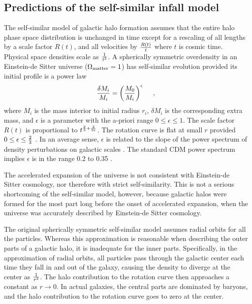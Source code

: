 \documentclass[aps,prd,preprint,tightenlines,floatfix,showpacs,groupedaddress]{revtex4}
\begin{document}
\subsection{Predictions of the self-similar infall model}

The self-similar model of galactic halo formation \cite{FG,B,STW}
assumes that the entire halo phase space distribution is unchanged 
in time except for a rescaling of all lengths by a scale factor 
$R(t)$, and all velocities by ${R(t) \over t}$ where $t$ is cosmic 
time.  Physical space densities scale as ${1 \over t^2}$.  A 
spherically symmetric overdensity in an Einstein-de Sitter universe 
($\Omega_{\rm matter} = 1$) has self-similar evolution provided its 
initial profile is a power law \cite{FG,B}
\begin{equation}
{\delta M_i \over M_i} = \left({M_0 \over M_i}\right)^\epsilon~~~\ ,
\label{prof}
\end{equation}
where $M_i$ is the mass interior to initial radius $r_i$, $\delta M_i$ 
is the corresponding extra mass, and $\epsilon$ is a parameter with the 
a-priori range $0 \leq \epsilon \leq 1$.  The scale factor $R(t)$ is 
proportional to $t^{{2 \over 3} + {2 \over 9 \epsilon}}$.  The rotation 
curve is flat at small $r$ provided 
$0 \leq \epsilon \leq {2 \over 3}$ \cite{FG}.  In an average sense,
$\epsilon$ is related to the slope of the power spectrum of density 
perturbations on galactic scales \cite{Dor}.  The standard CDM power 
spectrum implies $\epsilon$ is in the range 0.2 to 0.35 \cite{STW}.

The accelerated expansion \cite{acc} of the universe is not 
consistent with Einstein-de Sitter cosmology, nor therefore 
with strict self-similarity.  This is not a serious shortcoming 
of the self-similar model, however, because galactic halos were 
formed for the most part long before the onset of accelerated 
expansion, when the universe was accurately described by 
Einstein-de Sitter cosmology.   

The original spherically symmetric self-similar model \cite{FG,B} 
assumes radial orbits for all the particles.  Whereas this approximation 
is reasonable when describing the outer parts of a galactic halo, it is 
inadequate for the inner parts.  Specifically, in the approximation of
radial orbits, all particles pass through the galactic center each 
time they fall in and out of the galaxy, causing the density to 
diverge at the center as ${1 \over r^2}$.  The halo contribution 
to the rotation curve then approaches a constant as $r \rightarrow 0$.
In actual galaxies, the central parts are dominated by baryons, and the 
halo contribution to the rotation curve goes to zero at the center.  
\end{document}
